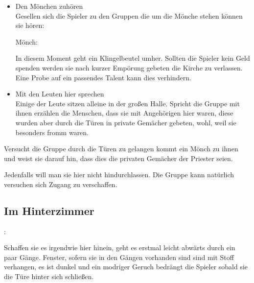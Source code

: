 \begin{itemize}
  \item Den Mönchen zuhören \\
  Gesellen sich die Spieler zu den Gruppen die um die Mönche stehen können sie hören:

  Mönch: 

  In diesem Moment geht ein Klingelbeutel umher. Sollten die Spieler kein Geld spenden werden sie nach kurzer Empörung gebeten die Kirche zu verlassen. Eine Probe auf ein passendes Talent kann dies verhindern.

  \item Mit den Leuten hier sprechen \\
  Einige der Leute sitzen alleine in der großen Halle. Spricht die Gruppe mit ihnen erzählen die Menschen, dass sie mit Angehörigen hier waren, diese wurden aber durch die Türen in private Gemächer gebeten, wohl, weil sie besonders fromm waren.
\end{itemize}

Versucht die Gruppe durch die Türen zu gelangen kommt ein Mönch zu ihnen und weist sie darauf hin, dass dies die privaten Gemächer der Priester seien.


Jedenfalls will man sie hier nicht hindurchlassen. Die Gruppe kann natürlich versuchen sich Zugang zu verschaffen.

\subsection{Im Hinterzimmer}
\label{hinten}

:

Schaffen sie es irgendwie hier hinein, geht es erstmal leicht abwärts durch ein paar Gänge. Fenster, sofern sie in den Gängen vorhanden sind sind mit Stoff verhangen, es ist dunkel und ein modriger Geruch bedrängt die Spieler sobald sie die Türe hinter sich schließen.

